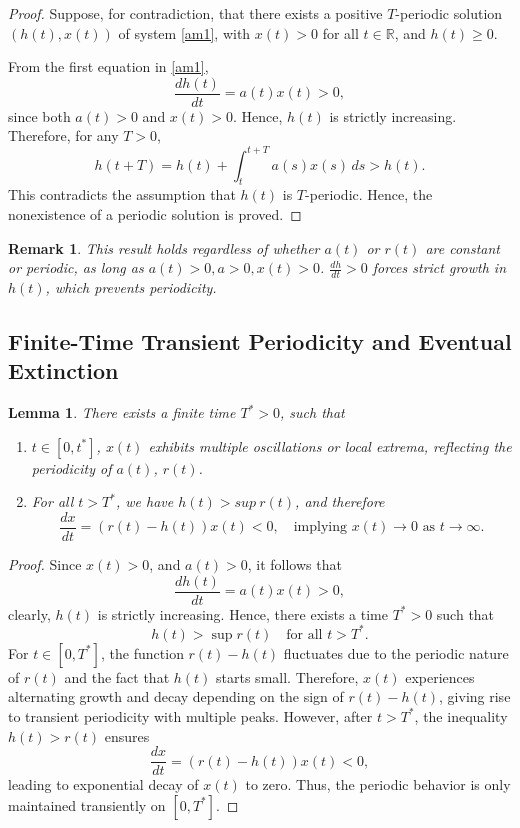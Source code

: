 \documentclass[sn-mathphys-num]{sn-jnl}
\newtheorem{lemma}[theorem]{Lemma}
\newtheorem{remark}{Remark}
\numberwithin{equation}{section}
\numberwithin{equation}{section}
\begin{document}
	\begin{proof}
		Suppose, for contradiction, that there exists a positive $T$-periodic solution $(h(t), x(t))$ of system \eqref{am1}, with $x(t) > 0$ for all  $t \in \mathbb{R}$, and $h(t) \geq 0$.
		
		From the first equation in \eqref{am1},
		\[
		\frac{dh(t)}{dt} = a(t) x(t) > 0,
		\]
		since both $a(t) > 0$ and $x(t) > 0$. Hence, $h(t)$ is strictly increasing. Therefore, for any $T > 0$,
		\[
		h(t + T) = h(t) + \int_t^{t+T} a(s) x(s)\, ds > h(t).
		\]
		This contradicts the assumption that $h(t)$ is $T$-periodic. Hence, the nonexistence of a periodic solution is proved.
	\end{proof}
	
	\begin{remark}
		This result holds regardless of whether $a(t)$ or $r(t)$ are constant or periodic, as long as $a(t)>0, a>0, x(t)>0$.
		$\frac{dh}{dt}>0$ forces strict growth in $h(t)$, which prevents periodicity. 
	\end{remark}
	
	\subsection{Finite-Time Transient Periodicity and Eventual Extinction}
	\begin{lemma} \label{transient_proof}
		There exists a finite time $T^{*}>0$, such that 
		\begin{enumerate}
			\item[(i)] $t\in [0,t^{*}]$, $x(t)$ exhibits multiple oscillations or local extrema, reflecting the periodicity of $a(t)$, $r(t)$.
			\item[(ii)] For all $t > T^{*}$, we have $h(t) > sup \  r(t)$, and therefore
			\[
			\frac{dx}{dt} = (r(t) - h(t))x(t) < 0, \quad \text{implying } x(t) \to 0 \text{ as } t \to \infty.
			\]
		\end{enumerate}
	\end{lemma}
	
\begin{proof}
		Since $ x(t) > 0 $, and $ a(t) > 0 $, it follows that
		\[
		\frac{dh(t)}{dt} = a(t)x(t) > 0,
		\]
		clearly, $h(t)$  is strictly increasing.
		Hence, there exists a time $T^* > 0$ such that
		\[
		h(t) > \sup r(t) \quad \text{for all } t > T^*.
		\]
		For $t \in [0, T^*]$, the function $r(t) - h(t)$ fluctuates due to the periodic nature of $r(t)$ and the fact that $h(t)$ starts small. Therefore, $x(t)$ experiences alternating growth and decay depending on the sign of $r(t) - h(t)$, giving rise to transient periodicity with multiple peaks. However, after $t > T^{*}$, the inequality $h(t) > r(t)$ ensures
		\[
		\frac{dx}{dt} = (r(t) - h(t))x(t) < 0,
		\]
		leading to exponential decay of $x(t)$ to zero. Thus, the periodic behavior is only maintained transiently on $[0, T^*]$.
	\end{proof}
\end{document}
